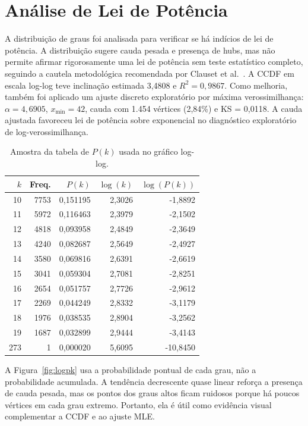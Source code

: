 \documentclass[sigconf]{webmedia}
\begin{document}
\section{Análise de Lei de Potência}

A distribuição de graus foi analisada para verificar se há indícios de
lei de potência. A
distribuição sugere cauda pesada e presença de hubs, mas não
permite afirmar rigorosamente uma lei de potência sem teste estatístico
completo, seguindo a cautela metodológica recomendada por
Clauset et al.~\cite{clauset2009powerlaw}. A CCDF em escala log-log teve inclinação estimada 3,4808 e
$R^2=0,9867$. Como melhoria, também foi aplicado um ajuste discreto
exploratório por máxima verossimilhança: $\alpha=4,6905$,
$x_{\min}=42$, cauda com 1.454 vértices (2,84\%) e KS = 0,0118. A
cauda ajustada favoreceu lei de potência sobre exponencial no diagnóstico
exploratório de log-verossimilhança.

\begin{table}
  \caption{Amostra da tabela de $P(k)$ usada no gráfico log-log.}
  \label{tab:pk}
  \begin{tabular}{@{}rrrrr@{}}
    \toprule
    $k$ & Freq. & $P(k)$ & $\log(k)$ & $\log(P(k))$ \\
    \midrule
    10 & 7753 & 0,151195 & 2,3026 & -1,8892 \\
    11 & 5972 & 0,116463 & 2,3979 & -2,1502 \\
    12 & 4818 & 0,093958 & 2,4849 & -2,3649 \\
    13 & 4240 & 0,082687 & 2,5649 & -2,4927 \\
    14 & 3580 & 0,069816 & 2,6391 & -2,6619 \\
    15 & 3041 & 0,059304 & 2,7081 & -2,8251 \\
    16 & 2654 & 0,051757 & 2,7726 & -2,9612 \\
    17 & 2269 & 0,044249 & 2,8332 & -3,1179 \\
    18 & 1976 & 0,038535 & 2,8904 & -3,2562 \\
    19 & 1687 & 0,032899 & 2,9444 & -3,4143 \\
    273 & 1 & 0,000020 & 5,6095 & -10,8450 \\
    \bottomrule
  \end{tabular}
\end{table}

A Figura~\ref{fig:logpk} usa a probabilidade pontual de cada grau, não a
probabilidade acumulada. A tendência decrescente quase linear reforça a
presença de cauda pesada, mas os pontos dos graus altos ficam ruidosos
porque há poucos vértices em cada grau extremo. Portanto, ela é útil como
evidência visual complementar a CCDF e ao ajuste MLE.
\end{document}
